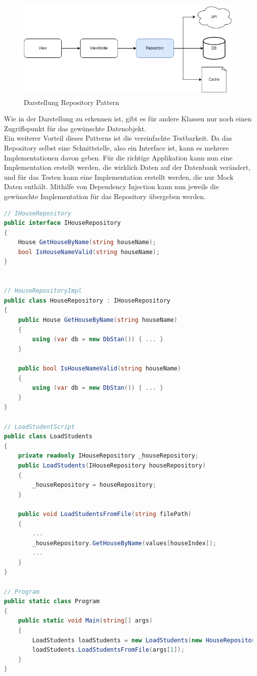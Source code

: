 \documentclass[a4paper, table]{article}
\begin{document}
\begin{figure}[h]
    \centering
    \includegraphics[width=1\textwidth,height=5cm]{img/Repository_Pattern.png}
    \caption{Darstellung Repository Pattern}
    \label{fig:repository_pattern}
\end{figure}

Wie in der Darstellung zu erkennen ist, gibt es für andere Klassen nur noch einen Zugriffspunkt für das gewünschte Datenobjekt.\\
Ein weiterer Vorteil dieses Patterns ist die vereinfachte Testbarkeit. 
Da das Repository selbst eine Schnittstelle, also ein Interface ist, kann es mehrere Implementationen davon geben. 
Für die richtige Applikation kann nun eine Implementation erstellt werden, die wirklich Daten auf der Datenbank verändert, und für das Testen kann eine Implementation erstellt werden, die nur Mock Daten enthält.
Mithilfe von Dependency Injection kann nun jeweils die gewünschte Implementation für das Repository übergeben werden.

\begin{lstlisting}[language=csharp]
// IHouseRepository
public interface IHouseRepository
{
    House GetHouseByName(string houseName);
    bool IsHouseNameValid(string houseName);
}


// HouseRepositoryImpl
public class HouseRepository : IHouseRepository
{
    public House GetHouseByName(string houseName)
    {
        using (var db = new DbStan()) { ... }
    }

    public bool IsHouseNameValid(string houseName)
    {
        using (var db = new DbStan()) { ... }
    }
}

// LoadStudentScript
public class LoadStudents
{
    private readonly IHouseRepository _houseRepository;
    public LoadStudents(IHouseRepository houseRepository)
    {
        _houseRepository = houseRepository;
    }

    public void LoadStudentsFromFile(string filePath)
    {
        ...
        _houseRepository.GetHouseByName(values[houseIndex]);
        ...
    }
}

// Program
public static class Program
{
    public static void Main(string[] args)
    {
        LoadStudents loadStudents = new LoadStudents(new HouseRepository());
        loadStudents.LoadStudentsFromFile(args[1]);
    }
}
\end{lstlisting}
\end{document}
